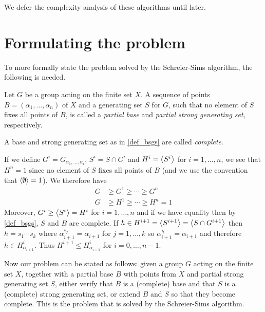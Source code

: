 We defer the complexity analysis of these algorithms until later.

\section{Formulating the problem}
To more formally state the problem solved by the Schreier-Sims algorithm, the following is needed.
\begin{deff}
  Let $G$ be a group acting on the finite set $X$. A sequence of points
  $B = (\alpha_1, \dotsc, \alpha_n)$ of $X$ and a generating set $S$ for $G$, such that no element of $S$ fixes all points of $B$, is called a \emph{partial base} and \emph{partial strong generating set}, respectively. 
\end{deff}
\begin{remark}
A base and strong generating set as in \ref{def_bsgs} are called \emph{complete}.
\end{remark}
\begin{remark} \label{rmk_partial_bsgs}
  If we define $G^i = G_{\alpha_1, \dotsc, \alpha_i}$, $S^i = S \cap
  G^i$ and $H^i = \left\langle S^i \right\rangle$ for $i = 1, \dotsc, n$, we see that $H^n
  = 1$ since no element of $S$ fixes all points of $B$ (and we use the
  convention that $\left\langle \emptyset \right\rangle = 1$). We therefore have
\begin{align}
G & \geq G^1 \geq \dotsb \geq G^n \\
G & \geq H^1 \geq \dotsb \geq H^n = 1 
\end{align}
Moreover, $G^i \geq \left\langle S^i \right\rangle = H^i$ for $i = 1, \dotsc, n$ and if we
have equality then by \ref{def_bsgs}, $S$ and $B$ are complete. If $h
\in H^{i + 1} = \left\langle S^{i + 1} \right\rangle = \left\langle S \cap G^{i + 1} \right\rangle$ then $h = s_1 \dotsm s_k$ where $\alpha_{i + 1}^{s_j} = \alpha_{i + 1}$ for $j = 1, \dotsc, k$ so $\alpha_{i + 1}^h = \alpha_{i + 1}$ and therefore $h \in H^i_{\alpha_{i + 1}}$. Thus $H^{i + 1} \leq H^i_{\alpha_{i + 1}}$ for $i = 0, \dotsc, n - 1$.
\end{remark}

Now our problem can be stated as follows: given a group $G$ acting on the
finite set $X$, together with a partial base $B$ with points from $X$
and partial strong generating set $S$, either verify that $B$ is a
(complete) base and that $S$ is a (complete) strong generating set, or
extend $B$ and $S$ so that they become complete. This is the problem that is
solved by the Schreier-Sims algorithm.


